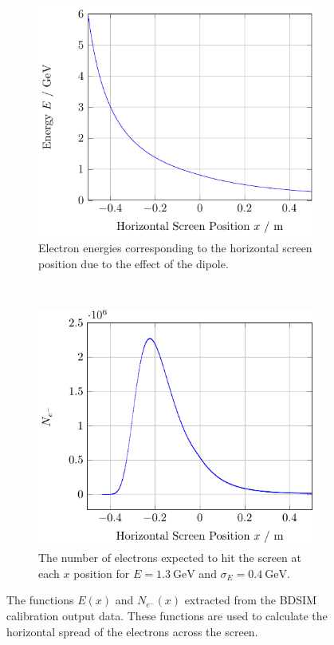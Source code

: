 \begin{figure}%
	\centering
	\begin{subfigure}[t]{\columnwidth}
		\includegraphics{./figures/eofx.pdf}
		\caption{
			Electron energies corresponding to the horizontal screen position
			due to the effect of the dipole.
		}
		\label{fig:eofx}
	\end{subfigure}\hfill~
	\begin{subfigure}[t]{\columnwidth}
		\includegraphics{./figures/edist.pdf}
		\caption{
			The number of electrons expected to hit the screen at each \(x\)
			position for \(E=\SI{1.3}{\giga\electronvolt}\) and
			\(\sigma_E=\SI{0.4}{\giga\electronvolt}\).
		}
		\label{fig:edist}
	\end{subfigure}
	\caption{
		The functions \(E(x)\) and \(N_{e^-}(x)\) extracted from the BDSIM
		calibration output data. These functions are used to calculate the
		horizontal spread of the electrons across the screen.
	}
\end{figure}

